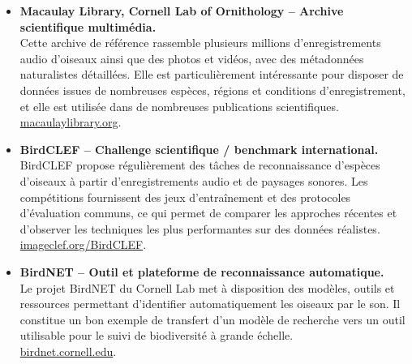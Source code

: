\documentclass[11pt,a4paper]{article}
\begin{document}
\begin{itemize}
    \item \textbf{Macaulay Library, Cornell Lab of Ornithology -- Archive scientifique multimédia.}\\
    Cette archive de référence rassemble plusieurs millions d'enregistrements audio d'oiseaux ainsi que des photos et vidéos, avec des métadonnées naturalistes détaillées. Elle est particulièrement intéressante pour disposer de données issues de nombreuses espèces, régions et conditions d'enregistrement, et elle est utilisée dans de nombreuses publications scientifiques.\\
    \href{https://www.macaulaylibrary.org/}{macaulaylibrary.org}.

    \item \textbf{BirdCLEF -- Challenge scientifique / benchmark international.}\\
    BirdCLEF propose régulièrement des tâches de reconnaissance d'espèces d'oiseaux à partir d'enregistrements audio et de paysages sonores. Les compétitions fournissent des jeux d'entraînement et des protocoles d'évaluation communs, ce qui permet de comparer les approches récentes et d'observer les techniques les plus performantes sur des données réalistes.\\
    \href{https://www.imageclef.org/BirdCLEF}{imageclef.org/BirdCLEF}.

    \item \textbf{BirdNET -- Outil et plateforme de reconnaissance automatique.}\\
    Le projet BirdNET du Cornell Lab met à disposition des modèles, outils et ressources permettant d'identifier automatiquement les oiseaux par le son. Il constitue un bon exemple de transfert d'un modèle de recherche vers un outil utilisable pour le suivi de biodiversité à grande échelle.\\
    \href{https://birdnet.cornell.edu/}{birdnet.cornell.edu}.
\end{itemize}
\end{document}
